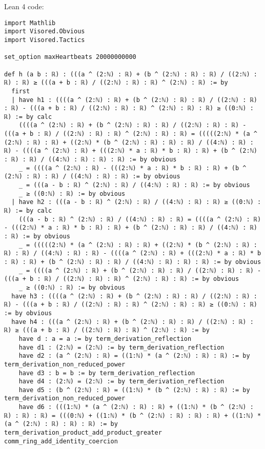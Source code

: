 \documentclass{article}
\begin{document}
Lean 4 code:
\begin{tcolorbox}[colback=white!10, width=\linewidth]
\begin{lstlisting}[language=Lean4]
import Mathlib
import Visored.Obvious
import Visored.Tactics

set_option maxHeartbeats 20000000000

def h (a b : ℝ) : (((a ^ (2:ℕ) : ℝ) + (b ^ (2:ℕ) : ℝ) : ℝ) / ((2:ℕ) : ℝ) : ℝ) ≥ (((a + b : ℝ) / ((2:ℕ) : ℝ) : ℝ) ^ (2:ℕ) : ℝ) := by
  first
  | have h1 : ((((a ^ (2:ℕ) : ℝ) + (b ^ (2:ℕ) : ℝ) : ℝ) / ((2:ℕ) : ℝ) : ℝ) - (((a + b : ℝ) / ((2:ℕ) : ℝ) : ℝ) ^ (2:ℕ) : ℝ) : ℝ) ≥ ((0:ℕ) : ℝ) := by calc
    ((((a ^ (2:ℕ) : ℝ) + (b ^ (2:ℕ) : ℝ) : ℝ) / ((2:ℕ) : ℝ) : ℝ) - (((a + b : ℝ) / ((2:ℕ) : ℝ) : ℝ) ^ (2:ℕ) : ℝ) : ℝ) = (((((2:ℕ) * (a ^ (2:ℕ) : ℝ) : ℝ) + ((2:ℕ) * (b ^ (2:ℕ) : ℝ) : ℝ) : ℝ) / ((4:ℕ) : ℝ) : ℝ) - ((((a ^ (2:ℕ) : ℝ) + (((2:ℕ) * a : ℝ) * b : ℝ) : ℝ) + (b ^ (2:ℕ) : ℝ) : ℝ) / ((4:ℕ) : ℝ) : ℝ) : ℝ) := by obvious
    _ = ((((a ^ (2:ℕ) : ℝ) - (((2:ℕ) * a : ℝ) * b : ℝ) : ℝ) + (b ^ (2:ℕ) : ℝ) : ℝ) / ((4:ℕ) : ℝ) : ℝ) := by obvious
    _ = (((a - b : ℝ) ^ (2:ℕ) : ℝ) / ((4:ℕ) : ℝ) : ℝ) := by obvious
    _ ≥ ((0:ℕ) : ℝ) := by obvious
  | have h2 : (((a - b : ℝ) ^ (2:ℕ) : ℝ) / ((4:ℕ) : ℝ) : ℝ) ≥ ((0:ℕ) : ℝ) := by calc
    (((a - b : ℝ) ^ (2:ℕ) : ℝ) / ((4:ℕ) : ℝ) : ℝ) = ((((a ^ (2:ℕ) : ℝ) - (((2:ℕ) * a : ℝ) * b : ℝ) : ℝ) + (b ^ (2:ℕ) : ℝ) : ℝ) / ((4:ℕ) : ℝ) : ℝ) := by obvious
    _ = (((((2:ℕ) * (a ^ (2:ℕ) : ℝ) : ℝ) + ((2:ℕ) * (b ^ (2:ℕ) : ℝ) : ℝ) : ℝ) / ((4:ℕ) : ℝ) : ℝ) - ((((a ^ (2:ℕ) : ℝ) + (((2:ℕ) * a : ℝ) * b : ℝ) : ℝ) + (b ^ (2:ℕ) : ℝ) : ℝ) / ((4:ℕ) : ℝ) : ℝ) : ℝ) := by obvious
    _ = ((((a ^ (2:ℕ) : ℝ) + (b ^ (2:ℕ) : ℝ) : ℝ) / ((2:ℕ) : ℝ) : ℝ) - (((a + b : ℝ) / ((2:ℕ) : ℝ) : ℝ) ^ (2:ℕ) : ℝ) : ℝ) := by obvious
    _ ≥ ((0:ℕ) : ℝ) := by obvious
  have h3 : ((((a ^ (2:ℕ) : ℝ) + (b ^ (2:ℕ) : ℝ) : ℝ) / ((2:ℕ) : ℝ) : ℝ) - (((a + b : ℝ) / ((2:ℕ) : ℝ) : ℝ) ^ (2:ℕ) : ℝ) : ℝ) ≥ ((0:ℕ) : ℝ) := by obvious
  have h4 : (((a ^ (2:ℕ) : ℝ) + (b ^ (2:ℕ) : ℝ) : ℝ) / ((2:ℕ) : ℝ) : ℝ) ≥ (((a + b : ℝ) / ((2:ℕ) : ℝ) : ℝ) ^ (2:ℕ) : ℝ) := by
    have d : a = a := by term_derivation_reflection
    have d1 : (2:ℕ) = (2:ℕ) := by term_derivation_reflection
    have d2 : (a ^ (2:ℕ) : ℝ) = ((1:ℕ) * (a ^ (2:ℕ) : ℝ) : ℝ) := by term_derivation_non_reduced_power
    have d3 : b = b := by term_derivation_reflection
    have d4 : (2:ℕ) = (2:ℕ) := by term_derivation_reflection
    have d5 : (b ^ (2:ℕ) : ℝ) = ((1:ℕ) * (b ^ (2:ℕ) : ℝ) : ℝ) := by term_derivation_non_reduced_power
    have d6 : (((1:ℕ) * (a ^ (2:ℕ) : ℝ) : ℝ) + ((1:ℕ) * (b ^ (2:ℕ) : ℝ) : ℝ) : ℝ) = (((0:ℕ) + ((1:ℕ) * (b ^ (2:ℕ) : ℝ) : ℝ) : ℝ) + ((1:ℕ) * (a ^ (2:ℕ) : ℝ) : ℝ) : ℝ) := by term_derivation_product_add_product_greater comm_ring_add_identity_coercion

\end{lstlisting}
\end{tcolorbox}
\end{document}
